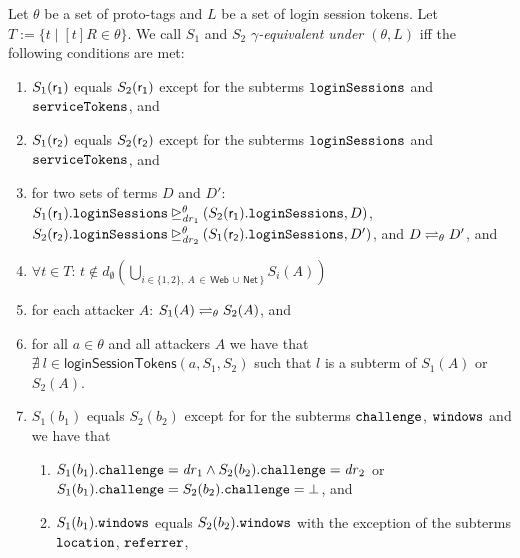   \begin{definition}\label{def:eq-of-states}
    Let $\theta$ be a set of proto-tags and 
    $L$ be a set of login session tokens.
    Let $T:=\{t\mid [t]R\in \theta\}$. 
    We call $S_1$ and $S_2$ \emph{$\gamma$-equivalent under 
    $(\theta, L)$} iff the following conditions are met:
    \begin{enumerate}
    \item\label{eqs:r1} $S_1(\fAP{r_1})$ equals $S_2(\fAP{r_1})$ except
      for the subterms $\str{loginSessions}$ and $\str{serviceTokens}$, and
    \item\label{eqs:r2} $S_1(\fAP{r_2})$ equals $S_2(\fAP{r_2})$ except
      for the subterms $\str{loginSessions}$ and $\str{serviceTokens}$, and
    \item\label{eqs:logsess} for two sets of terms $D$ and $D'$:
      $\logsessminus{S_1(\fAP{r_1}).\str{loginSessions}}{S_2(\fAP{r_1}).\str{loginSessions}}{\theta}{\mi{dr}_1}{D}$,
      $\logsessminus{S_2(\fAP{r_2}).\str{loginSessions}}{S_1(\fAP{r_2}).\str{loginSessions}}{\theta}{\mi{dr}_2}{D'}$,
      and $D \prototagequiv{\theta} D'$, and
    \item\label{eqs:att-not-t} $\forall t \in T$:
      $t \not\in d_\emptyset(\bigcup_{i \in \{1,2\},\ A\, \in\, \mathsf{Web}\, \cup \,
      \mathsf{Net}\, 
      \}}S_i(A))$
    \item\label{eqs:att} for each attacker $A$:
      $S_1(A) \prototagequiv{\theta} S_2(A)$, and
    \item\label{eqs:att-not-l} for all $a\in\theta$ and all attackers $A$ we have that
      $\nexists\ l \in \mathsf{loginSessionTokens}(a,S_1,S_2)$ such that
      $l$ is a subterm of $S_1(A)$ or $S_2(A)$.
    \item\label{eqs:b} $S_1(b_1)$ equals $S_2(b_2)$ except for for the
      subterms $\str{challenge}$, $\str{windows}$
      and we have that
      \begin{enumerate}
      \item \label{eqs:b:challenge}
        $S_1(b_1).\str{challenge} = \mi{dr}_1 \wedge
        S_2(b_2).\str{challenge} = \mi{dr}_2$
        or $S_1(b_1).\str{challenge} = S_2(b_2).\str{challenge} = \bot$,
        and
      \item $S_1(b_1).\str{windows}$ equals $S_2(b_2).\str{windows}$ with
        the exception of the subterms $\str{location}$, $\str{referrer}$,

\end{enumerate}
\end{enumerate}
\end{definition}
